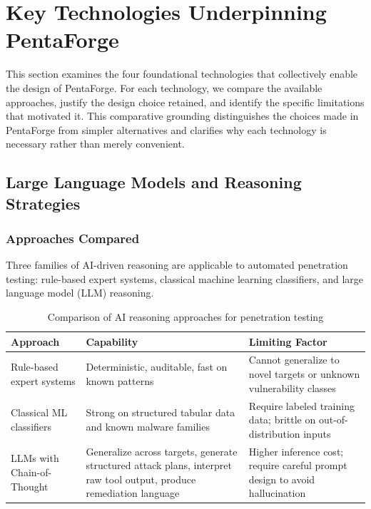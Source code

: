 \documentclass[12pt,a4paper]{report}
\begin{document}
\section{Key Technologies Underpinning PentaForge}

This section examines the four foundational technologies that collectively
enable the design of PentaForge. For each technology, we compare the
available approaches, justify the design choice retained, and identify the
specific limitations that motivated it. This comparative grounding
distinguishes the choices made in PentaForge from simpler alternatives and
clarifies why each technology is necessary rather than merely convenient.

\subsection{Large Language Models and Reasoning Strategies}

\subsubsection{Approaches Compared}

Three families of AI-driven reasoning are applicable to automated penetration
testing: rule-based expert systems, classical machine learning classifiers,
and large language model (LLM) reasoning.

\begin{table}[H]
    \centering
    \renewcommand{\arraystretch}{1.35}
    \begin{tabular}{|p{}|p{}|p{}|}
        \hline
        \textbf{Approach} & \textbf{Capability} & \textbf{Limiting Factor} \\
        \hline
        Rule-based expert systems & Deterministic, auditable, fast on known
        patterns & Cannot generalize to novel targets or
        unknown vulnerability classes \\
        \hline
        Classical ML classifiers & Strong on structured tabular data and
        known malware families & Require labeled training data; brittle on
        out-of-distribution inputs \\
        \hline
        LLMs with Chain-of-Thought & Generalize across targets, generate
        structured attack plans, interpret raw tool output, produce
        remediation language & Higher inference cost; require careful
        prompt design to avoid hallucination \\
        \hline
    \end{tabular}
    \caption{Comparison of AI reasoning approaches for penetration testing}
    \label{tab:llm_approaches}
\end{table}
\end{document}
